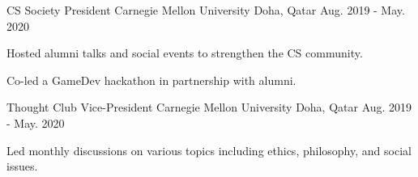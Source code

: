 \begin{cventries}
\cventry
  {CS Society President} %
  {Carnegie Mellon University} %
  {Doha, Qatar} %
  {Aug. 2019 - May. 2020} %
  {
    \begin{cvitems} %
      \item {Hosted alumni talks and social events to strengthen the CS community.}
      \item {Co-led a GameDev hackathon in partnership with alumni.}
    \end{cvitems}
  }
    
\cventry
  {Thought Club Vice-President} %
  {Carnegie Mellon University} %
  {Doha, Qatar} %
  {Aug. 2019 - May. 2020} %
  {
    \begin{cvitems} %
      \item {Led monthly discussions on various topics including ethics, philosophy, and social issues.}
    \end{cvitems}
  }
    
\end{cventries}
